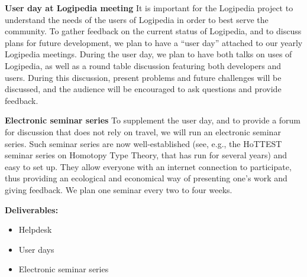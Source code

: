\begin{workpackage}[id=dissemination,wphases=0-48,type=MGT,
  short=Dissemination,%
  title={Dissemination, communication and exploitation},
  lead=Inr]
\begin{tasklist}
\begin{task}[id=researchers-club,
      title=Expanding the use of Logipedia in research,
      lead=Bir,BirRM=2]
\begin{compactenum}
     \item [\textbf{User day at Logipedia meeting}]
     It is important for the Logipedia project to understand the needs of the users of Logipedia in order to best serve the community.
     To gather feedback on the current status of Logipedia, and to discuss plans for future development, we plan to have a ``user day'' attached to our yearly Logipedia meetings. 
     During the user day, we plan to have both talks on uses of Logipedia, as well as a round table discussion featuring both developers and users.
     During this discussion, present problems and future challenges will be discussed, and the audience will be encouraged to ask questions and provide feedback.
     \item [\textbf{Electronic seminar series}]
     To supplement the user day, and to provide a forum for discussion that does not rely on travel, we will run an electronic seminar series.
     Such seminar series are now well-established (see, e.g., the HoTTEST seminar series on Homotopy Type Theory, that has run for several years) and easy to set up. They allow everyone with an internet connection to participate, thus providing an ecological and economical way of presenting one's work and giving feedback. We plan one seminar every two to four weeks.
    \end{compactenum}

    \textbf{Deliverables:}
    \begin{itemize}
     \item Helpdesk
     \item User days
     \item Electronic seminar series
    \end{itemize}

  \end{task}


\end{tasklist}
\end{workpackage}
